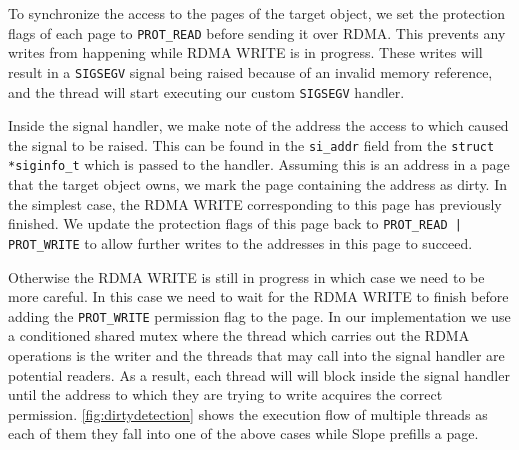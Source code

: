 To synchronize the access to the pages of the target object,
we set the protection flags of each page to \texttt{PROT\_READ} before sending
it over RDMA. This prevents any writes from happening while RDMA WRITE
is in progress. These writes will result in a \texttt{SIGSEGV} signal being
raised because of an invalid memory reference, and the thread will start
executing our custom \texttt{SIGSEGV} handler.

Inside the signal handler, we make note of the address the access
to which caused the signal to be raised. This can be found in the
\texttt{si\_addr} field from the
\texttt{struct {*}siginfo\_t} which is passed to the handler.
Assuming this is an address in a
page that the target object owns, we mark the page containing the address as
dirty. In the simplest case, the RDMA WRITE corresponding to this page has
previously finished. We update the protection flags of this page back
to \texttt{PROT\_READ | PROT\_WRITE}
to allow further writes to the addresses in this page to succeed.

Otherwise the RDMA WRITE is still in progress in which case we need to be
more careful. In this case we need to wait for the
RDMA WRITE to finish before adding the \texttt{PROT\_WRITE} permission flag to
the page. In our
implementation we use a conditioned shared mutex where the thread which carries
out the RDMA operations is the writer and the threads that may call into the
signal handler are potential readers. As a result, each thread will will block
inside the signal handler until
the address to which they are trying to write acquires the correct permission.
\autoref{fig:dirtydetection} shows the execution flow of multiple threads
as each of them they fall into one of the above cases while Slope prefills a
page.

